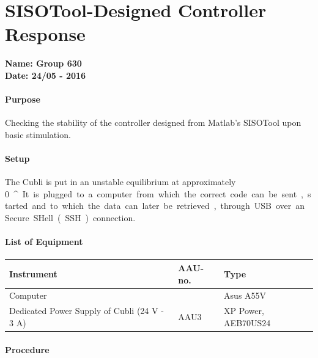 \chapter{SISOTool-Designed Controller Response} \label{app:hSISOControllerFinalTest}
\textbf{Name: Group 630}\\
\textbf{Date: 24/05 - 2016}

\subsubsection{Purpose}
Checking the stability of the controller designed from Matlab's SISOTool upon basic stimulation.

\subsubsection{Setup}
The Cubli is put in an unstable equilibrium at approximately \SI{0}{^{\circ}}. 
It is plugged to a computer from which the correct code can be sent, started and to which the data can later be retrieved, through USB over an Secure SHell (SSH) connection.

\subsubsection{List of Equipment}
\begin{table}[H]
\begin{tabular}{|p{8cm}|p{2cm}|p{4cm}|}
\hline%
  \textbf{Instrument}    &  \textbf{AAU-no.}          &  \textbf{Type} \\
\hline%
  Computer               &            &  Asus A55V  \\
\hline%
Dedicated Power Supply of Cubli \small{(24 V - 3 A)} &  AAU3                   &  XP Power, AEB70US24                 \\
\hline%
\end{tabular}
\end{table}

\subsubsection{Procedure}

